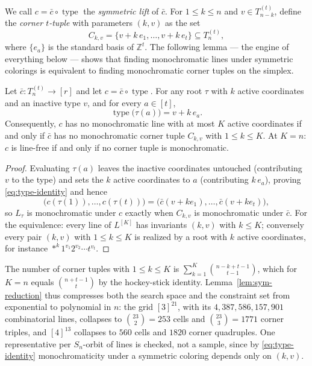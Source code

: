 \documentclass[12pt]{article}
\newcommand{\Z}{\mathbb{Z}}
\newcommand{\Ls}{L}
\DeclareMathOperator{\type}{type}
\begin{document}
We call $c=\bar c\circ\type$ the \emph{symmetric lift} of $\bar c$. For
$1\le k\le n$ and $v\in T_{n-k}^{(t)}$, define the \emph{corner
$t$-tuple} with parameters $(k,v)$ as the set
\[
C_{k,v}=\bigl\{v+k\,e_{1},\dots,v+k\,e_{t}\bigr\}\subseteq T_{n}^{(t)},
\]
where $\{e_{a}\}$ is the standard basis of $\Z^{t}$. The following lemma
--- the engine of everything below --- shows that finding monochromatic
lines under symmetric colorings is equivalent to finding monochromatic
corner tuples on the simplex.

\begin{lemma}\label{lem:sym-reduction}
Let $\bar c\colon T_{n}^{(t)}\to[r]$ and let $c=\bar c\circ\type$. For
any root $\tau$ with $k$ active coordinates and an inactive type $v$,
and for every $a\in[t]$,
\begin{equation}\label{eq:type-identity}
\type\bigl(\tau(a)\bigr)=v+k\,e_{a}.
\end{equation}
Consequently, $c$ has no monochromatic line with at most $K$ active
coordinates if and only if $\bar c$ has no monochromatic corner tuple
$C_{k,v}$ with $1\le k\le K$. At $K=n$: $c$ is line-free if and only if
no corner tuple is monochromatic.
\end{lemma}

\begin{proof}
Evaluating $\tau(a)$ leaves the inactive coordinates untouched
(contributing $v$ to the type) and sets the $k$ active coordinates to
$a$ (contributing $k\,e_{a}$), proving \eqref{eq:type-identity} and
hence
\[
\bigl(c(\tau(1)),\dots,c(\tau(t))\bigr)
=\bigl(\bar c(v+ke_{1}),\dots,\bar c(v+ke_{t})\bigr),
\]
so $\Ls_{\tau}$ is monochromatic under $c$ exactly when $C_{k,v}$ is
monochromatic under $\bar c$. For the equivalence: every line of
$\Ls^{[K]}$ has invariants $(k,v)$ with $k\le K$; conversely every pair
$(k,v)$ with $1\le k\le K$ is realized by a root with $k$ active
coordinates, for instance ${*}^{k}1^{v_{1}}2^{v_{2}}\cdots t^{v_{t}}$.
\end{proof}

\begin{remark}[Compression]\label{rem:compression}
The number of corner tuples with $1\le k\le K$ is
$\sum_{k=1}^{K}\binom{n-k+t-1}{t-1}$, which for $K=n$ equals
$\binom{n+t-1}{t}$ by the hockey-stick identity.
Lemma~\ref{lem:sym-reduction} thus compresses both the search space and
the constraint set from exponential to polynomial in $n$: the grid
$[3]^{21}$, with its $4{,}387{,}586{,}157{,}901$ combinatorial lines,
collapses to $\binom{23}{2}=253$ cells and $\binom{23}{3}=1771$ corner
triples, and $[4]^{13}$ collapses to $560$ cells and $1820$ corner
quadruples. One representative per $S_{n}$-orbit of lines is checked,
not a sample, since by \eqref{eq:type-identity} monochromaticity under a
symmetric coloring depends only on $(k,v)$.
\end{remark}
\end{document}
